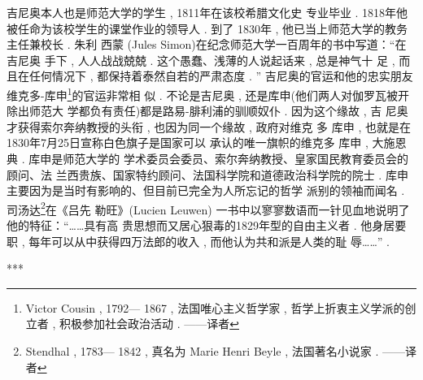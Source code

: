 吉尼奥本人也是师范大学的学生 , 1811年在该校希腊文化史 专业毕业 . 1818年他被任命为该校学生的课堂作业的领导人 .  到了 1830年 , 他已当上师范大学的教务主任兼校长 . 朱利 \textbullet 西蒙 (Jules Simon)在纪念师范大学一百周年的书中写道：“在吉尼奥 手下 , 人人战战兢兢 . 这个愚蠢、浅薄的人说起话来 , 总是神气十 足 , 而且在任何情况下 , 都保持着泰然自若的严肃态度 . ”
吉尼奥的官运和他的忠实朋友维克多-库申\footnote{Victor Cousin ,  1792— 1867 , 法国唯心主义哲学家 , 哲学上折衷主义学派的创立者 , 积极参加社会政治活动 . ——译者}的官运非常相 似 . 不论是吉尼奥 , 还是库申(他们两人对伽罗瓦被开除出师范大 学都负有责任)都是路易-腓利浦的驯顺奴仆 . 因为这个缘故 , 吉 尼奥才获得索尔奔纳教授的头衔 , 也因为同一个缘故 , 政府对维克 多 \textbullet 库申 , 也就是在1830年7月25日宣称白色旗子是国家可以 承认的唯一旗帜的维克多 \textbullet 库申 , 大施恩典 . 库申是师范大学的 学术委员会委员、索尔奔纳教授、皇家国民教育委员会的顾问、法 兰西贵族、国家特约顾问、法国科学院和道德政治科学院的院士 .  库申主要因为是当时有影响的、但目前已完全为人所忘记的哲学 派别的领袖而闻名 . 司汤达\footnote{Stendhal ,  1783— 1842 , 真名为 Marie Henri Beyle , 法国著名小说家 . ——译者}在《吕先 \textbullet 勒旺》(Lucien Leuwen) 一书中以寥寥数语而一针见血地说明了他的特征：“……具有高 贵思想而又居心狠毒的1829年型的自由主义者 . 他身居要职 , 每年可以从中获得四万法郎的收入 , 而他认为共和派是人类的耻 辱……” . 

\begin{center}***
\end{center}

